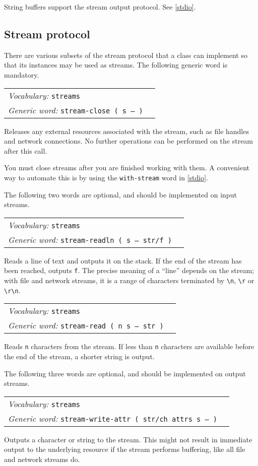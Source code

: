 \documentclass{book}
\newcommand{\vocabulary}[1]{\emph{Vocabulary:} \texttt{#1}&\\}
\newcommand{\genericword}[2]{\index{\texttt{#1}}\emph{Generic word:} \texttt{#2}&\\}
\newcommand{\wordtable}[1]{


\begin{tabularx}{12cm}{lX}
\hline
#1
\hline
\end{tabularx}

}
\begin{document}
String buffers support the stream output protocol. See \ref{stdio}.

\subsection{\label{stream-protocol}Stream protocol}

There are various subsets of the stream protocol that a class can implement so that its instances may be used as streams. The following generic word is mandatory.

\wordtable{
\vocabulary{streams}
\genericword{stream-close}{stream-close ( s -- )}
}
Releases any external resources associated with the stream, such as file handles and network connections. No further operations can be performed on the stream after this call.

You must close streams after you are finished working with them. A convenient way to automate this is by using the \texttt{with-stream} word in \ref{stdio}.

The following two words are optional, and should be implemented on input streams.
\wordtable{
\vocabulary{streams}
\genericword{stream-readln}{stream-readln ( s -- str/f )}
}
Reads a line of text and outputs it on the stack. If the end of the stream has been reached, outputs \texttt{f}. The precise meaning of a ``line'' depends on the stream; with file and network streams, it is a range of characters terminated by \verb|\n|, \verb|\r| or \verb|\r\n|.
\wordtable{
\vocabulary{streams}
\genericword{stream-read}{stream-read ( n s -- str )}
}
Reads \texttt{n} characters from the stream. If less than \texttt{n} characters are available before the end of the stream, a shorter string is output.

The following three words are optional, and should be implemented on output streams.

\wordtable{
\vocabulary{streams}
\genericword{stream-write-attr}{stream-write-attr ( str/ch attrs s -- )}
}
Outputs a character or string to the stream. This might not result in immediate output to the underlying resource if the stream performs buffering, like all file and network streams do. 
\end{document}

